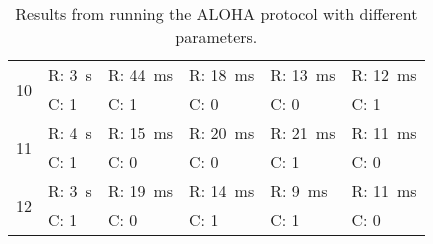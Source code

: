 \begin{table}[H]
\begin{tabular}{|c|l|l|l|l|l|}
        \multirow{2}{*}{10}    & R: 3~s                          & R: 44~ms                        & R: 18~ms                      & R: 13~ms                       & R: 12~ms                       \\
                               & C: 1                            & C: 1                            & C: 0                          & C: 0                           & C: 1                           \\ \hline

        \multirow{2}{*}{11}    & R: 4~s                          & R: 15~ms                        & R: 20~ms                      & R: 21~ms                       & R: 11~ms                       \\
                               & C: 1                            & C: 0                            & C: 0                          & C: 1                           & C: 0                           \\ \hline

        \multirow{2}{*}{12}    & R: 3~s                          & R: 19~ms                          & R: 14~ms                        & R: 9~ms                         & R: 11~ms                         \\
                               & C: 1                           & C: 0                            & C: 1                         & C: 1                           & C: 0                           \\ \hline
    \end{tabular}
    \caption{Results from running the ALOHA protocol with different parameters.}
    \label{table:experiments:aloha-results}
\end{table}